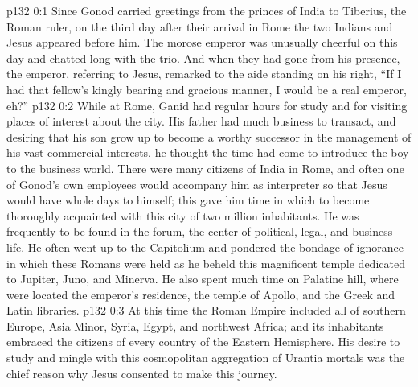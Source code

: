 \author{Midwayer Commission}
\vs p132 0:1 Since Gonod carried greetings from the princes of India to Tiberius, the Roman ruler, on the third day after their arrival in Rome the two Indians and Jesus appeared before him. The morose emperor was unusually cheerful on this day and chatted long with the trio. And when they had gone from his presence, the emperor, referring to Jesus, remarked to the aide standing on his right, “If I had that fellow’s kingly bearing and gracious manner, I would be a real emperor, eh?”
\pc \vs p132 0:2 While at Rome, Ganid had regular hours for study and for visiting places of interest about the city. His father had much business to transact, and desiring that his son grow up to become a worthy successor in the management of his vast commercial interests, he thought the time had come to introduce the boy to the business world. There were many citizens of India in Rome, and often one of Gonod’s own employees would accompany him as interpreter so that Jesus would have whole days to himself; this gave him time in which to become thoroughly acquainted with this city of two million inhabitants. He was frequently to be found in the forum, the center of political, legal, and business life. He often went up to the Capitolium and pondered the bondage of ignorance in which these Romans were held as he beheld this magnificent temple dedicated to Jupiter, Juno, and Minerva. He also spent much time on Palatine hill, where were located the emperor’s residence, the temple of Apollo, and the Greek and Latin libraries.
\pc \vs p132 0:3 At this time the Roman Empire included all of southern Europe, Asia Minor, Syria, Egypt, and northwest Africa; and its inhabitants embraced the citizens of every country of the Eastern Hemisphere. His desire to study and mingle with this cosmopolitan aggregation of Urantia mortals was the chief reason why Jesus consented to make this journey.
